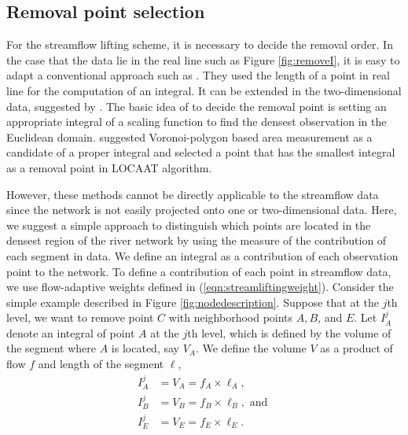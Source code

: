 \documentclass[11pt,titlepage]{article}
\begin{document}
\subsection{Removal point selection}

For the streamflow lifting scheme, it is necessary to decide the removal order. In the case that the data lie in the real line such as Figure \ref{fig:removeI}, it is easy to adapt a conventional approach such as \cite{Nunes2006}. They used the length of a point in real line for the computation of an integral. It can be extended in the two-dimensional data, suggested by \cite{Jansen2009}. The basic idea of \cite{Jansen2009} to decide the removal point is setting an appropriate integral of a scaling function to find the densest observation in the Euclidean domain. \cite{Jansen2009} suggested Voronoi-polygon based area measurement as a candidate of a proper integral and selected a point that has the smallest integral as a removal point in LOCAAT algorithm.

However, these methods cannot be directly applicable to the streamflow data since the network is not easily projected onto one or two-dimensional data. Here, we suggest a simple approach to distinguish which points are located in the densest region of the river network by using the measure of the contribution of each segment in data. We define an integral as a contribution of each observation point to the network.
To define a contribution of each point in streamflow data, we use flow-adaptive weights defined in (\ref{eqn:streamliftingweight}). Consider the simple example described in Figure \ref{fig:nodedescription}. Suppose that at the $j$th level, we want to remove point $C$ with neighborhood points $A, B$, and $E$. Let $I_A^{j}$ denote an integral of point $A$ at the $j$th level, which is defined by the volume of the segment where $A$ is located, say $V_A$. We define the volume $V$ as a product of flow $f$ and length of the segment $\ell$,
\begin{align}
I_A^{j} &= V_A = f_A\times \ell_A,\nonumber\\
I_B^{j} &= V_B = f_B\times \ell_B, \text{ and }\\
I_E^{j} &= V_E = f_E\times \ell_E.\nonumber
\end{align}
\end{document}
